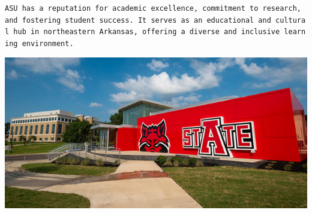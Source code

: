 \documentclass[
  letterpaper,
  DIV=11,
  numbers=noendperiod]{scrartcl}
\begin{document}
\texttt{ASU\ has\ a\ reputation\ for\ academic\ excellence,\ commitment\ to\ research,\ and\ fostering\ student\ success.\ It\ serves\ as\ an\ educational\ and\ cultural\ hub\ in\ northeastern\ Arkansas,\ offering\ a\ diverse\ and\ inclusive\ learning\ environment.}

\includegraphics{Welcome-Center-web.jpeg}
\end{document}
